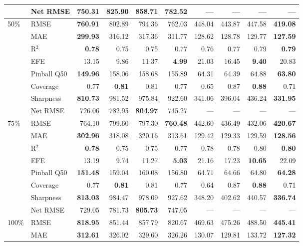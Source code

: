 \begin{table}[htbp]
\begin{tabular}{llrrrrrrrr}
 & Net RMSE & 750.31 & 825.90 & \bfseries 858.71 & 782.52 & --- & --- & --- & --- \\
\midrule
\multirow[c]{8}{*}{50\%} & RMSE & \bfseries 760.91 & 802.89 & 794.36 & 762.03 & 448.04 & 443.87 & 447.58 & \bfseries 419.08 \\
 & MAE & \bfseries 299.93 & 316.12 & 317.36 & 311.77 & 128.62 & 128.78 & 129.77 & \bfseries 127.59 \\
 & R$^2$ & \bfseries 0.78 & 0.75 & 0.75 & 0.77 & 0.76 & 0.77 & 0.79 & \bfseries 0.79 \\
 & EFE & 13.15 & 9.86 & 11.37 & \bfseries 4.99 & 21.03 & 16.45 & \bfseries 9.40 & 20.83 \\
 & Pinball Q50 & \bfseries 149.96 & 158.06 & 158.68 & 155.89 & 64.31 & 64.39 & 64.88 & \bfseries 63.80 \\
 & Coverage & 0.77 & \bfseries 0.81 & 0.81 & 0.77 & 0.65 & 0.87 & \bfseries 0.88 & 0.71 \\
 & Sharpness & \bfseries 810.73 & 981.52 & 975.84 & 922.60 & 341.06 & 396.04 & 436.24 & \bfseries 331.95 \\
 & Net RMSE & 726.06 & 782.95 & \bfseries 804.97 & 745.27 & --- & --- & --- & --- \\
\midrule
\multirow[c]{8}{*}{75\%} & RMSE & 764.10 & 799.60 & 797.30 & \bfseries 760.48 & 442.60 & 436.49 & 432.06 & \bfseries 420.67 \\
 & MAE & \bfseries 302.96 & 318.08 & 320.16 & 313.61 & 129.42 & 129.33 & 129.59 & \bfseries 128.56 \\
 & R$^2$ & \bfseries 0.78 & 0.75 & 0.75 & 0.77 & 0.78 & 0.78 & 0.80 & \bfseries 0.80 \\
 & EFE & 13.19 & 9.74 & 11.27 & \bfseries 5.03 & 21.16 & 17.23 & \bfseries 10.65 & 22.09 \\
 & Pinball Q50 & \bfseries 151.48 & 159.04 & 160.08 & 156.80 & 64.71 & 64.66 & 64.80 & \bfseries 64.28 \\
 & Coverage & 0.77 & \bfseries 0.81 & 0.81 & 0.77 & 0.64 & 0.87 & \bfseries 0.88 & 0.71 \\
 & Sharpness & \bfseries 813.03 & 984.47 & 978.09 & 927.62 & 348.20 & 402.62 & 440.57 & \bfseries 336.74 \\
 & Net RMSE & 729.05 & 781.73 & \bfseries 805.73 & 747.05 & --- & --- & --- & --- \\
\midrule
\multirow[c]{8}{*}{100\%} & RMSE & \bfseries 818.95 & 851.44 & 857.79 & 820.67 & 469.63 & 475.26 & 488.50 & \bfseries 445.41 \\
 & MAE & \bfseries 312.61 & 326.02 & 329.60 & 326.26 & 130.07 & 129.81 & 133.72 & \bfseries 127.32 \\

\end{tabular}
\end{table}
